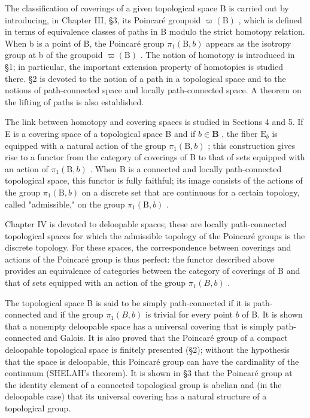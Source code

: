 \documentclass[12pt,a4paper,oneside]{book}
\begin{document}
The classification of coverings of a given topological space B is carried out by introducing, in Chapter III, §3, its Poincaré groupoid \(\varpi(\mathrm{B})\) , which is defined in terms of equivalence classes of paths in B modulo the strict homotopy relation. When b is a point of B, the Poincaré group \(\pi_{1}(\mathrm{B},b)\) appears as the isotropy group at b of the groupoid \(\varpi(\mathrm{B})\) . The notion of homotopy is introduced in §1; in particular, the important extension property of homotopies is studied there. §2 is devoted to the notion of a path in a topological space and to the notions of path-connected space and locally path-connected space. A theorem on the lifting of paths is also established.

The link between homotopy and covering spaces is studied in Sections 4 and 5. If E is a covering space of a topological space B and if \(b \in \mathbf{B}\) , the fiber \(\mathrm{E}_b\) is equipped with a natural action of the group \(\pi_1(\mathrm{B}, b)\) ; this construction gives rise to a functor from the category of coverings of B to that of sets equipped with an action of \(\pi_1(\mathrm{B}, b)\) . When B is a connected and locally path-connected topological space, this functor is fully faithful; its image consists of the actions of the group \(\pi_1(\mathrm{B}, b)\) on a discrete set that are continuous for a certain topology, called "admissible," on the group \(\pi_1(\mathrm{B}, b)\) .

Chapter IV is devoted to deloopable spaces; these are locally path-connected topological spaces for which the admissible topology of the Poincaré groups is the discrete topology. For these spaces, the correspondence between coverings and actions of the Poincaré group is thus perfect: the functor described above provides an equivalence of categories between the category of coverings of B and that of sets equipped with an action of the group \(\pi_{1}(B,b)\) .

The topological space B is said to be simply path-connected if it is path-connected and if the group \(\pi_1(B, b)\) is trivial for every point \(b\) of B. It is shown that a nonempty deloopable space has a universal covering that is simply path-connected and Galois. It is also proved that the Poincaré group of a compact deloopable topological space is finitely presented (§2); without the hypothesis that the space is deloopable, this Poincaré group can have the cardinality of the continuum (SHELAH's theorem). It is shown in §3 that the Poincaré group at the identity element of a connected topological group is abelian and (in the deloopable case) that its universal covering has a natural structure of a topological group.
\end{document}
